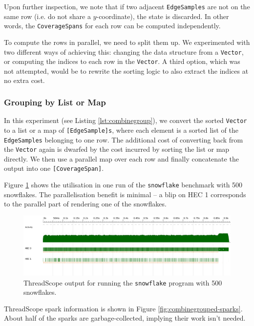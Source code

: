 \documentclass[12pt, a4paper]{article}
\begin{document}
Upon further inspection, we note that if two adjacent \texttt{EdgeSamples} are not on the same row (i.e. do not share a $y$-coordinate), the state is discarded. In other words, the \texttt{CoverageSpans} for each row can be computed independently.

To compute the rows in parallel, we need to split them up. We experimented with two different ways of achieving this: changing the data structure from a \texttt{Vector}, or computing the indices to each row in the \texttt{Vector}. A third option, which was not attempted,  would be to rewrite the sorting logic to also extract the indices at no extra cost.

\subsubsection{Grouping by List or Map}\label{sec:combine-glist}

In this experiment (see Listing \ref{lst:combinegroup}), we convert the sorted \texttt{Vector} to a list or a map of \texttt{[EdgeSample]s}, where each element is a sorted list of the \texttt{EdgeSamples} belonging to one row. The additional cost of converting back from the \texttt{Vector} again is dwarfed by the cost incurred by sorting the list or map directly. We then use a parallel map over each row and finally concatenate the output into one \texttt{[CoverageSpan]}.

Figure \ref{fig:combinegrouped} shows the utilisation in one run of the \texttt{snowflake} benchmark with 500 snowflakes. The parallelisation benefit is minimal -- a blip on HEC 1 corresponds to the parallel part of rendering one of the snowflakes.

 \begin{figure}[H]
  \centering
  \includegraphics[width=\linewidth]{../threadscope/combinegrouped/bigflake}
  \caption{ThreadScope output for running the \texttt{snowflake} program with 500 snowflakes.}
  \label{fig:combinegrouped}
\end{figure}

ThreadScope spark information is shown in Figure \ref{fig:combinegrouped-sparks}. About half of the sparks are garbage-collected, implying their work isn't needed.
\end{document}
